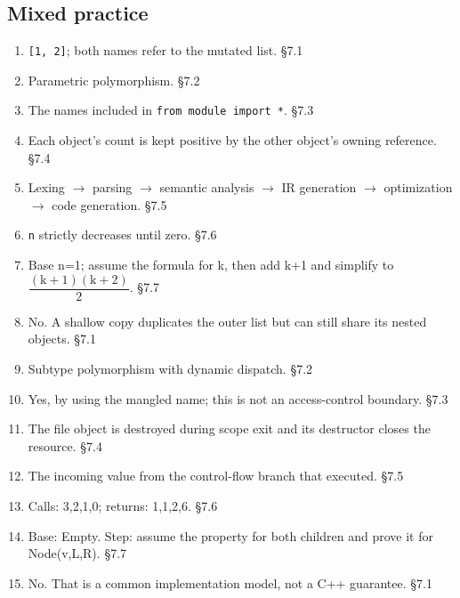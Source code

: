 \documentclass[11pt]{article}
\begin{document}
\begin{keepsection}\subsection{Mixed practice}

\begin{enumerate}
\item \texttt{[1, 2]}; both names refer to the mutated list. \hfill{\small\color{FAUblue}§7.1}
\item Parametric polymorphism. \hfill{\small\color{FAUblue}§7.2}
\item The names included in \texttt{from module import *}. \hfill{\small\color{FAUblue}§7.3}
\item Each object’s count is kept positive by the other object’s owning reference. \hfill{\small\color{FAUblue}§7.4}
\item Lexing \ensuremath{\to} parsing \ensuremath{\to} semantic analysis \ensuremath{\to} IR generation \ensuremath{\to} optimization \ensuremath{\to} code generation. \hfill{\small\color{FAUblue}§7.5}
\item \texttt{n} strictly decreases until zero. \hfill{\small\color{FAUblue}§7.6}
\item Base n=1; assume the formula for k, then add k+1 and simplify to {\small\ensuremath{\dfrac{(\mathrm{k}+1)(\mathrm{k}+2)}{2}}}. \hfill{\small\color{FAUblue}§7.7}
\item No. A shallow copy duplicates the outer list but can still share its nested objects. \hfill{\small\color{FAUblue}§7.1}
\item Subtype polymorphism with dynamic dispatch. \hfill{\small\color{FAUblue}§7.2}
\item Yes, by using the mangled name; this is not an access-control boundary. \hfill{\small\color{FAUblue}§7.3}
\item The file object is destroyed during scope exit and its destructor closes the resource. \hfill{\small\color{FAUblue}§7.4}
\item The incoming value from the control-flow branch that executed. \hfill{\small\color{FAUblue}§7.5}
\item Calls: 3,2,1,0; returns: 1,1,2,6. \hfill{\small\color{FAUblue}§7.6}
\item Base: Empty. Step: assume the property for both children and prove it for Node(v,L,R). \hfill{\small\color{FAUblue}§7.7}
\item No. That is a common implementation model, not a C++ guarantee. \hfill{\small\color{FAUblue}§7.1}

\end{enumerate}
\end{keepsection}
\end{document}
